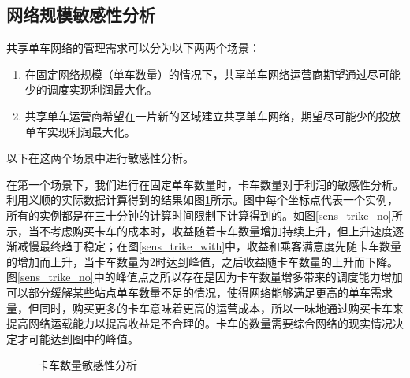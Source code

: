 \documentclass[]{tongjithesis}
\numberwithin{equation}{chapter}
\begin{document}
\subsection{网络规模敏感性分析}
共享单车网络的管理需求可以分为以下两两个场景：
\begin{enumerate}
	\item 在固定网络规模（单车数量）的情况下，共享单车网络运营商期望通过尽可能少的调度实现利润最大化。
	\item 共享单车运营商希望在一片新的区域建立共享单车网络，期望尽可能少的投放单车实现利润最大化。
\end{enumerate}

以下在这两个场景中进行敏感性分析。

在第一个场景下，我们进行在固定单车数量时，卡车数量对于利润的敏感性分析。利用义顺的实际数据计算得到的结果如图\ref{sens_trike}所示。图中每个坐标点代表一个实例，所有的实例都是在三十分钟的计算时间限制下计算得到的。如图\ref{sens_trike_no}所示，当不考虑购买卡车的成本时，收益随着卡车数量增加持续上升，但上升速度逐渐减慢最终趋于稳定；在图\ref{sens_trike_with}中，收益和乘客满意度先随卡车数量的增加而上升，当卡车数量为2时达到峰值，之后收益随卡车数量的上升而下降。图\ref{sens_trike_no}中的峰值点之所以存在是因为卡车数量增多带来的调度能力增加可以部分缓解某些站点单车数量不足的情况，使得网络能够满足更高的单车需求量，但同时，购买更多的卡车意味着更高的运营成本，所以一味地通过购买卡车来提高网络运载能力以提高收益是不合理的。卡车的数量需要综合网络的现实情况决定才可能达到图中的峰值。
\begin{figure}[H]
	\centering
	\hfil
	\hfil
	\caption{卡车数量敏感性分析}
	\label{sens_trike}
\end{figure}
\end{document}
